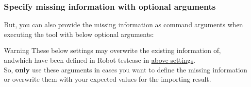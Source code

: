 \subsubsection{Specify missing information with optional arguments}
But, you can also provide the missing information as command arguments when executing the
\href{https://github.com/test-fullautomation/robotframework-robotlog2db}{\pkg} tool with 
below optional arguments:

\begin{boxwarning}{Warning}
These below settings may overwrite the existing information of,
andwhich have been defined in Robot testcase in 
\hyperref[description-robotframework-testcase-settings]{above settings}.
\\
So, \textbf{only} use these arguments in cases you want to define the missing information or 
overwrite them with your expected values for the importing result.
\end{boxwarning}

